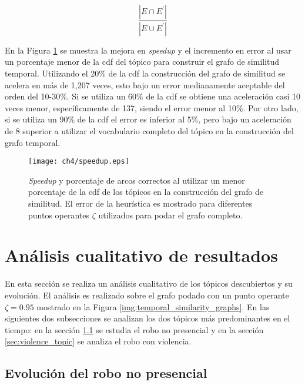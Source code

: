 \begin{equation}
  \frac{|E\cap E^{'}|}{|E\cup E^{'}|}
\end{equation}

En la Figura \ref{img:speedup} se muestra la mejora en \textit{speedup} y el incremento en error al usar un porcentaje menor de la cdf del tópico para construir el grafo de similitud temporal. Utilizando el 20\% de la cdf la construcción del grafo de similitud se acelera en más de 1,207 veces, esto bajo un error medianamente aceptable del orden del 10-30\%. Si se utiliza un 60\% de la cdf se obtiene una aceleración casi 10 veces menor, específicamente de 137, siendo el error menor al 10\%. Por otro lado, si se utiliza un 90\% de la cdf el error es inferior al 5\%, pero bajo un aceleración de 8 superior a utilizar el vocabulario completo del tópico en la construcción del grafo temporal. 

\begin{figure}
    \centering
    \texttt{[image: ch4/speedup.eps]}
    \caption{\textit{Speedup} y porcentaje de arcos correctos al utilizar un menor porcentaje de la cdf de los tópicos en la construcción del grafo de similitud. El error de la heurística es mostrado para diferentes puntos operantes $\zeta$ utilizados para podar el grafo completo.} 
    \label{img:speedup}
\end{figure}


\section{Análisis cualitativo de resultados}
\label{sec:qualitative}

En esta sección se realiza un análisis cualitativo de los tópicos descubiertos y su evolución. El análisis es realizado sobre el grafo podado con un punto operante $\zeta = 0.95$ mostrado en la Figura \ref{img:temporal_similarity_graphs}. En las siguientes dos subsecciones se analizan los dos tópicos más predominantes en el tiempo: en la sección \ref{sec:noviolence_topic} se estudia el robo no presencial y en la sección \ref{sec:violence_topic} se analiza el robo con violencia.

\subsection{Evolución del robo no presencial}
\label{sec:noviolence_topic}

